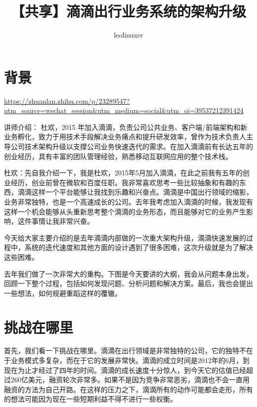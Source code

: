 \documentclass[12pt]{article}
\title{【共享】滴滴出行业务系统的架构升级}
\author{leolinuxer}
\begin{document}
\maketitle
\tableofcontents

\section{背景}
\url{https://zhuanlan.zhihu.com/p/23289547?utm_source=wechat_session&utm_medium=social&utm_oi=39537212391424}

讲师介绍：
杜欢，2015 年加入滴滴，负责公司公共业务、客户端/前端架构和新业务孵化，致力于用技术手段解决业务痛点和提升研发效率，曾作为技术负责人主导公司技术架构升级以支撑公司业务快速迭代的需求。在加入滴滴前有长达五年的创业经历，具有丰富的团队管理经验，熟悉移动互联网应用的整个技术栈。

杜欢：先自我介绍一下，我是杜欢，2015年5月加入滴滴，在此之前我有五年的创业经历，创业前曾在微软和百度任职。我非常喜欢思考一些比较抽象和有趣的东西，滴滴这样一个平台能够让我找到乐趣和兴奋点。滴滴是中国出行领域的缩影，业务非常独特，也是一个高速成长的公司。去年我考虑加入滴滴的时候，我发现有这样一个机会能够从头重新思考整个滴滴的业务形态，而且能够对它的业务产生影响，这件事情让我非常兴奋。

今天给大家主要介绍的是去年滴滴内部做的一次重大架构升级，滴滴快速发展的过程中，系统的迭代速度和其他方面的设计遇到了很多困难，这次升级就是为了解决这些困难。

去年我们做了一次非常大的重构。下图是今天要讲的大纲，我会从问题本身出发，回顾一下整个过程，包括如何发现问题、分析问题和解决方案。最后，我也会提出一些想法，如何规避重蹈这样的覆辙。

\section{挑战在哪里}
首先，我们看一下挑战在哪里。滴滴在出行领域是非常独特的公司，它的独特不在于业务模式多复杂，而在于它的发展非常快。滴滴的成立时间是2012年的6月，到现在为止才经过了四年的时间。滴滴的成长速度十分惊人，到今天它的估值已经超过260亿美元，融资轮次非常多。如果不是因为竞争非常恶劣，滴滴也不会一直用融资的方法为自己开路。在这样的压力之下，滴滴所有的动作可能都会走形，所有的想法可能因为现在一些短期利益不得不进行一些权衡。
\end{document}
